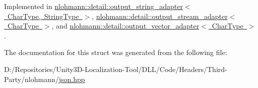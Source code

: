 Implemented in \mbox{\hyperlink{classnlohmann_1_1detail_1_1output__string__adapter_ab5ea4da075305d225dfd84ad997e8747}{nlohmann\+::detail\+::output\+\_\+string\+\_\+adapter$<$ Char\+Type, String\+Type $>$}}, \mbox{\hyperlink{classnlohmann_1_1detail_1_1output__stream__adapter_ad61375497a7d03cb0bdcddfdaad185d0}{nlohmann\+::detail\+::output\+\_\+stream\+\_\+adapter$<$ Char\+Type $>$}}, and \mbox{\hyperlink{classnlohmann_1_1detail_1_1output__vector__adapter_ad6f6c461dec7bedd5359454dc22fc9aa}{nlohmann\+::detail\+::output\+\_\+vector\+\_\+adapter$<$ Char\+Type $>$}}.



The documentation for this struct was generated from the following file\+:\begin{DoxyCompactItemize}
\item 
D\+:/\+Repositories/\+Unity3\+D-\/\+Localization-\/\+Tool/\+D\+L\+L/\+Code/\+Headers/\+Third-\/\+Party/nlohmann/\mbox{\hyperlink{json_8hpp}{json.\+hpp}}\end{DoxyCompactItemize}
